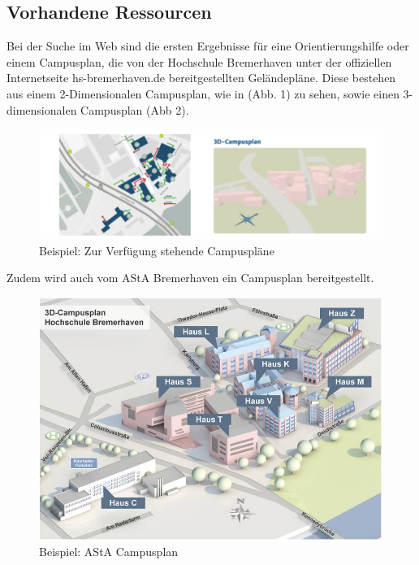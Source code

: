 \subsection{Vorhandene Ressourcen}
Bei der Suche im Web sind die ersten Ergebnisse für eine Orientierungshilfe oder einem Campusplan, die von der Hochschule Bremerhaven unter der offiziellen Internetseite hs-bremerhaven.de bereitgestellten Geländepläne. Diese bestehen aus einem 2-Dimensionalen Campusplan, wie in (Abb. 1) zu sehen, sowie einen 3-dimensionalen Campusplan (Abb 2).

\begin{figure}[H]
    \includegraphics[width=\textwidth]{Figures/3DNavigator/campusplan_bsp.jpg}
    \caption{Beispiel: Zur Verfügung stehende Campuspläne}
    \label{fig:integration}
    \centering
\end{figure}

Zudem wird auch vom AStA Bremerhaven ein Campusplan bereitgestellt.

\begin{figure}[H]
    \includegraphics[width=\textwidth]{Figures/3DNavigator/asta_campusplan.jpg}
    \caption{Beispiel: AStA Campusplan}
    \label{fig:integration}
    \centering
\end{figure}

